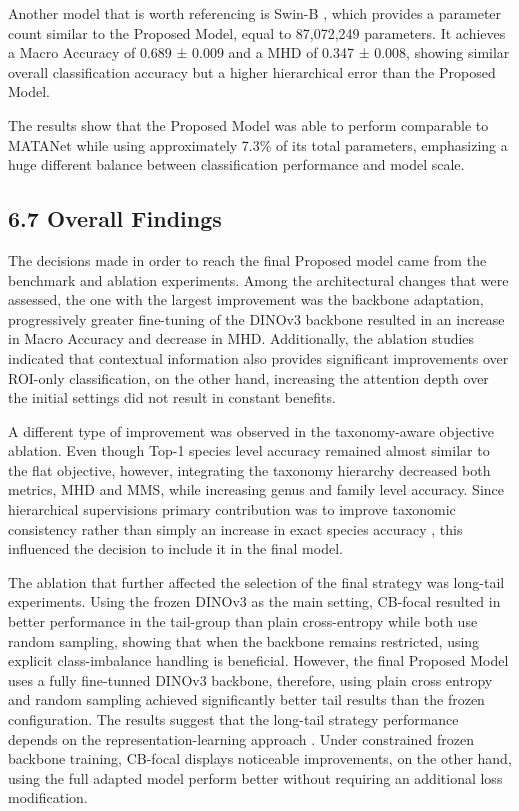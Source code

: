 \documentclass[preprint,12pt]{elsarticle}
\begin{document}
Another model that is worth referencing is Swin-B
\cite{ref38}, which provides a parameter count
similar to the Proposed Model, equal to 87,072,249 parameters. It
achieves a Macro Accuracy of 0.689 ± 0.009 and a MHD of 0.347 ± 0.008,
showing similar overall classification accuracy but a higher
hierarchical error than the Proposed Model.

The results show that the Proposed Model was able to perform comparable
to MATANet while using approximately 7.3\% of its total parameters,
emphasizing a huge different balance between classification performance
and model scale.

\subsection*{6.7 Overall Findings}\label{overall-findings}

The decisions made in order to reach the final Proposed model came from
the benchmark and ablation experiments. Among the architectural changes
that were assessed, the one with the largest improvement was the
backbone adaptation, progressively greater fine-tuning of the DINOv3
backbone resulted in an increase in Macro Accuracy and decrease in MHD.
Additionally, the ablation studies indicated that contextual information
also provides significant improvements over ROI-only classification, on
the other hand, increasing the attention depth over the initial settings
did not result in constant benefits.

A different type of improvement was observed in the taxonomy-aware
objective ablation. Even though Top-1 species level accuracy remained
almost similar to the flat objective, however, integrating the taxonomy
hierarchy decreased both metrics, MHD and MMS, while increasing genus
and family level accuracy. Since hierarchical
supervision\textquotesingle s primary contribution was to improve
taxonomic consistency rather than simply an increase in exact species
accuracy \cite{ref24}, this influenced the
decision to include it in the final model.

The ablation that further affected the selection of the final strategy
was long-tail experiments. Using the frozen DINOv3 as the main setting,
CB-focal \cite{ref14}
\cite{ref63} resulted in better performance in
the tail-group than plain cross-entropy while both use random sampling,
showing that when the backbone remains restricted, using explicit
class-imbalance handling is beneficial. However, the final Proposed
Model uses a fully fine-tunned DINOv3 backbone, therefore, using plain
cross entropy and random sampling achieved significantly better tail
results than the frozen configuration. The results suggest that the
long-tail strategy performance depends on the representation-learning
approach \cite{ref10}
\cite{ref65}. Under constrained frozen backbone
training, CB-focal displays noticeable improvements, on the other hand,
using the full adapted model perform better without requiring an
additional loss modification.
\end{document}
